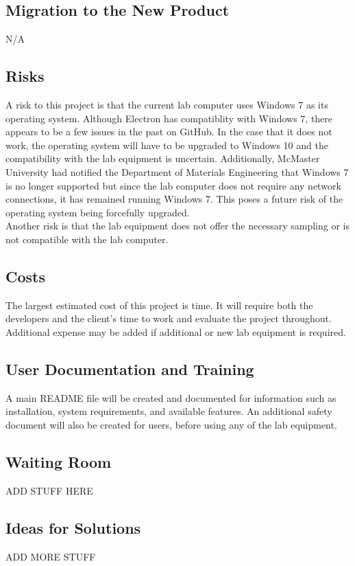 \documentclass[12pt, titlepage]{article}
\begin{document}
\subsection{Migration to the New Product}
N/A

\subsection{Risks}
A risk to this project is that the current lab computer uses Windows 7 as its operating system. Although Electron has compatiblity with Windows 7, there appears to be a few issues in the past on GitHub. 
In the case that it does not work, the operating system will have to be upgraded to Windows 10 and the compatibility with the lab equipment is uncertain. Additionally, McMaster University had notified the 
Department of Materials Engineering that Windows 7 is no longer supported but since the lab computer does not require any network connections, it has remained running Windows 7. This poses a future risk of 
the operating system being forcefully upgraded.\\

Another risk is that the lab equipment does not offer the necessary sampling or is not compatible with the lab computer. 

\subsection{Costs}
The largest estimated cost of this project is time. It will require both the developers and the client's time to work and evaluate the project throughout.
Additional expense may be added if additional or new lab equipment is required. 

\subsection{User Documentation and Training}
A main README file will be created and documented for information such as installation, system requirements, and available features. 
An additional safety document will also be created for users, before using any of the lab equipment. 

\subsection{Waiting Room}
ADD STUFF HERE

\subsection{Ideas for Solutions}
ADD MORE STUFF
\end{document}
